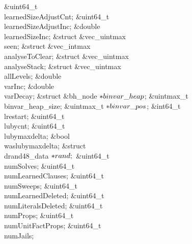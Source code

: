 \&{uint64\_t} \\{learnedSizeAdjustCnt};\6
\&{uint64\_t} \\{learnedSizeAdjustInc};\6
\&{double} \\{learnedSizeInc};\6
\&{struct} \&{vec\_uintmax} \\{seen};\6
\&{struct} \&{vec\_intmax} \\{analyseToClear};\6
\&{struct} \&{vec\_uintmax} \\{analyseStack};\6
\&{struct} \&{vec\_uintmax} \\{allLevels};\6
\&{double} \\{varInc};\6
\&{double} \\{varDecay};\6
\&{struct} \&{bh\_node} ${}{*}\\{binvar\_heap}{}$;\6
\&{uintmax\_t} \\{binvar\_heap\_size};\6
\&{uintmax\_t} ${}{*}\\{binvar\_pos}{}$;%
\6
\&{int64\_t} \\{lrestart};\6
\&{uint64\_t} \\{lubycnt};\6
\&{uint64\_t} \\{lubymaxdelta};\6
\&{bool} \\{waslubymaxdelta};\6
\&{struct} \\{drand48\_data} ${}{*}\\{rand};{}$\6
\&{uint64\_t} \\{numSolves};\6
\&{uint64\_t} \\{numLearnedClauses};\6
\&{uint64\_t} \\{numSweeps};\6
\&{uint64\_t} \\{numLearnedDeleted};\6
\&{uint64\_t} \\{numLiteralsDeleted};\6
\&{uint64\_t} \\{numProps};\6
\&{uint64\_t} \\{numUnitFactProps};\6
\&{uint64\_t} \\{numJails};\6

